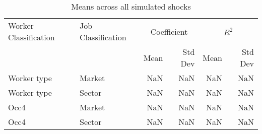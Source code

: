 \begin{table}
\centering
\caption{Means across all simulated shocks}
\label{table:all_sector_shocks_means}
\begin{tabular}{llrrrr}
\toprule
Worker Classification & Job Classification & \multicolumn{2}{c}{Coefficient} & \multicolumn{2}{c}{$R^2$} \\
               \hfill &             \hfill &        Mean & Std Dev &  Mean & Std Dev \\
\midrule
          Worker type &             Market &         NaN &     NaN &   NaN &     NaN \\
          Worker type &             Sector &         NaN &     NaN &   NaN &     NaN \\
                 Occ4 &             Market &         NaN &     NaN &   NaN &     NaN \\
                 Occ4 &             Sector &         NaN &     NaN &   NaN &     NaN \\
\bottomrule
\end{tabular}
\end{table}
